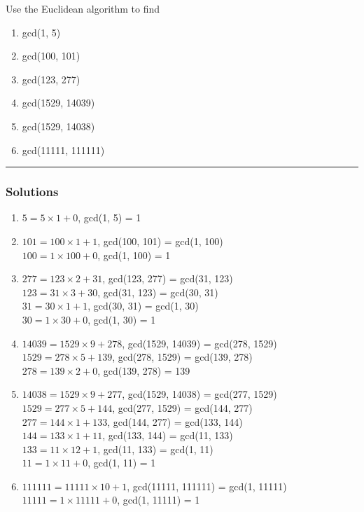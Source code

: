 \newpage
\begin{question}
Use the Euclidean algorithm to find
\begin{enumerate}[label=(\alph*)]
\item gcd(1, 5)
\item gcd(100, 101)
\item gcd(123, 277)
\item gcd(1529, 14039)
\item gcd(1529, 14038)
\item gcd(11111, 111111)
\end{enumerate}
\end{question}

\par\noindent\rule{\textwidth}{0.5pt}

\subsubsection*{Solutions}
\begin{enumerate}[label=(\alph*)]
\item
$5 = 5 \times 1 + 0$, gcd(1, 5) = 1

\item
$101 = 100 \times 1 + 1$, gcd(100, 101) = gcd(1, 100) \\
$100 = 1 \times 100 + 0$, gcd(1, 100) = 1

\item
$277 = 123 \times 2 + 31$, gcd(123, 277) = gcd(31, 123) \\
$123 = 31 \times 3 + 30$, gcd(31, 123) = gcd(30, 31) \\
$31 = 30 \times 1 + 1$, gcd(30, 31) = gcd(1, 30) \\
$30 = 1 \times 30 + 0$, gcd(1, 30) = 1

\item
$14039 = 1529 \times 9 + 278$, gcd(1529, 14039) = gcd(278, 1529) \\
$1529 = 278 \times 5 + 139$, gcd(278, 1529) = gcd(139, 278) \\
$278 = 139 \times 2 + 0$, gcd(139, 278) = 139

\item
$14038 = 1529 \times 9 + 277$, gcd(1529, 14038) = gcd(277, 1529) \\
$1529 = 277 \times 5 + 144$, gcd(277, 1529) = gcd(144, 277) \\
$277 = 144 \times 1 + 133$, gcd(144, 277) = gcd(133, 144) \\
$144 = 133 \times 1 + 11$, gcd(133, 144) = gcd(11, 133) \\
$133 = 11 \times 12 + 1$, gcd(11, 133) = gcd(1, 11) \\
$11 = 1 \times 11 + 0$, gcd(1, 11) = 1

\item
$111111 = 11111 \times 10 + 1$, gcd(11111, 111111) = gcd(1, 11111) \\
$11111 = 1 \times 11111 + 0$, gcd(1, 11111) = 1

\end{enumerate}